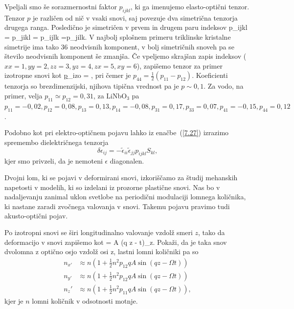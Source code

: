 Vpeljali smo še sorazmernostni faktor
$p_{ijkl}$, ki ga imenujemo elasto-optični tenzor. 
Tenzor $p$ je različen od nič v vsaki snovi, saj povezuje dva simetrična tenzorja 
drugega ranga. Posledično je simetričen v prvem in drugem paru indeksov
\beq
p_{ijkl} = p_{jikl} = p_{ijlk} =p_{jilk}.
\eeq
V najbolj splošnem primeru triklinske kristalne simetrije 
ima tako 36 neodvisnih komponent, v bolj simetričnih snoveh pa se število 
neodvisnih komponent še zmanjša. Če vpeljemo skrajšan zapis indeksov ($xx = 1,
yy=2, zz = 3, yz = 4, zx = 5, xy = 6$), zapišemo tenzor za primer izotropne snovi kot
\beq
\underline{p}_{\textrm{izo}} = 
,
\label{tenzorp}
\eeq
pri čemer je $p_{44}= \frac{1}{2}(p_{11}-p_{12})$. Koeficienti tenzorja so 
brezdimenzijski, njihova tipična vrednost pa je $p\sim0,1$. Za vodo, na primer, 
velja $p_{11} \simeq p_{12} = 0,31$, za LiNbO$_3$ pa $p_{11} = -0,02, 
p_{12} = 0,08, p_{13} = 0,13,  p_{14} = -0,08, p_{31} = 0,17, p_{33} = 0,07,
p_{41} = -0,15, p_{44} = 0,12$.

Podobno kot pri elektro-optičnem pojavu lahko iz enačbe~(\ref{7.27}) izrazimo
spremembo dielektričnega tenzorja 
\begin{equation}
\delta\epsilon_{ij}=-\tilde{\epsilon}_{ii}\tilde{\epsilon}_{jj}p_{ijkl}S_{kl},
\label{7.29}
\end{equation}
kjer smo privzeli, da je nemoteni $\epsilon$ diagonalen. 

Dvojni lom, ki se pojavi v deformirani snovi, izkoriščamo za študij
mehanskih napetosti v modelih, ki so izdelani iz prozorne plastične
snovi. Nas bo v nadaljevanju zanimal uklon svetlobe na periodični
modulaciji lomnega količnika, ki nastane zaradi zvočnega valovanja v snovi. Takemu pojavu
pravimo tudi akusto-optični pojav.

\begin{definition}
Po izotropni snovi se širi longitudinalno valovanje vzdolž smeri $z$, tako da 
deformacijo v snovi zapišemo kot
\beq
{} = A \cos(q z - \Omega t)_z.
\eeq
Pokaži, da je taka snov dvolomna z optično osjo vzdolž osi z, lastni 
lomni količniki pa so 
\begin{align}
n_{x'} &\approx n(1+\frac{1}{2}n^2p_{12}q A \sin (q z - \Omega t))\\
n_{y'} &\approx n(1+\frac{1}{2}n^2p_{12}q A \sin (q z - \Omega t))\\
n_z' &\approx n(1+\frac{1}{2}n^2p_{11}q A \sin (q z - \Omega t)),
\end{align}
kjer je $n$ lomni količnik v odsotnosti motnje.
\end{definition}

